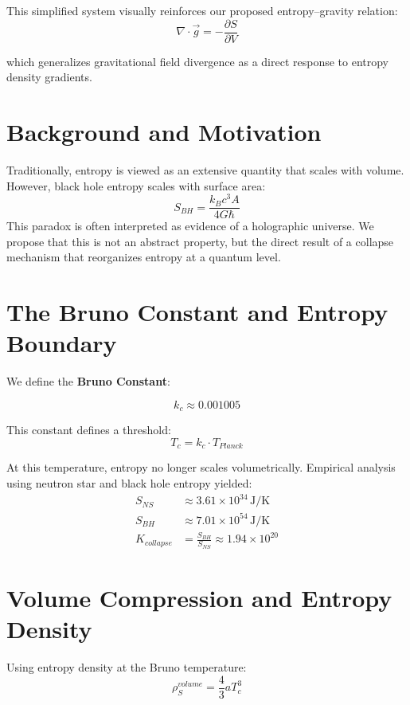 \documentclass[12pt]{article}
\begin{document}
This simplified system visually reinforces our proposed entropy–gravity relation:
\[
\nabla \cdot \vec{g} = -\frac{\partial S}{\partial V}
\]

which generalizes gravitational field divergence as a direct response to entropy density gradients.
\section{Background and Motivation}
Traditionally, entropy is viewed as an extensive quantity that scales with volume. However, black hole entropy scales with surface area:
\begin{equation}
S_{BH} = \frac{k_B c^3 A}{4 G \hbar}
\end{equation}
This paradox is often interpreted as evidence of a holographic universe. We propose that this is not an abstract property, but the direct result of a collapse mechanism that reorganizes entropy at a quantum level.

\section{The Bruno Constant and Entropy Boundary}

We define the \textbf{Bruno Constant}:

\begin{equation}
\boxed{k_c \approx 0.001005}
\end{equation}

This constant defines a threshold:
\begin{equation}
T_c = k_c \cdot T_{Planck}
\end{equation}

At this temperature, entropy no longer scales volumetrically. Empirical analysis using neutron star and black hole entropy yielded:
\begin{align}
S_{NS} &\approx 3.61 \times 10^{34} \, \text{J/K} \\
S_{BH} &\approx 7.01 \times 10^{54} \, \text{J/K} \\
K_{collapse} &= \frac{S_{BH}}{S_{NS}} \approx 1.94 \times 10^{20}
\end{align}

\section{Volume Compression and Entropy Density}

Using entropy density at the Bruno temperature:
\begin{equation}
\rho_S^{volume} = \frac{4}{3} a T_c^3
\end{equation}
\end{document}
